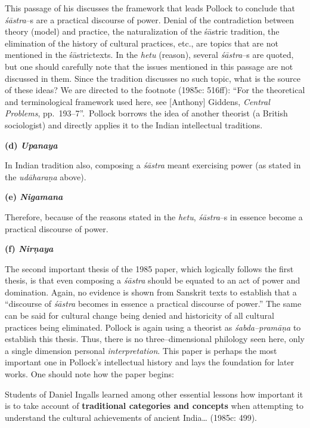 This passage of his discusses the framework that leads Pollock to conclude that\textit{ śāstra}–s are a practical discourse of power. Denial of the contradiction between theory (model) and practice, the naturalization of the śāstric tradition, the elimination of the history of cultural practices, etc., are topics that are not mentioned in the śāstrictexts. In the \textit{hetu} (reason), several \textit{śāstra}–s are quoted, but one should carefully note that the issues mentioned in this passage are not discussed in them. Since the tradition discusses no such topic, what is the source of these ideas? We are directed to the footnote (1985c: 516ff): “For the theoretical and terminological framework used here, see [Anthony] Giddens, \textit{Central Problems}, pp.~193–7”.~Pollock borrows the idea of another theorist (a British sociologist) and directly applies it to the Indian intellectual traditions.

\textbf{(d) \textit{Upanaya}}

In Indian tradition also, composing a \textit{śāstra }meant exercising power (as stated in the \textit{udāharaṇa} above).

\textbf{(e) \textit{Nigamana}}

Therefore, because of the reasons stated in the \textit{hetu}, \textit{śāstra}–s in essence become a practical discourse of power.

\textbf{(f) \textit{Nirṇaya}}

The second important thesis of the 1985 paper, which logically follows the first thesis, is that even composing a \textit{śāstra} should be equated to an act of power and domination. Again, no evidence is shown from Sanskrit texts to establish that a “discourse of \textit{śāstra} becomes in essence a practical discourse of power.” The same can be said for cultural change being denied and historicity of all cultural practices being eliminated. Pollock is again using a theorist as \textit{śabda–pramāṇa} to establish this thesis. Thus, there is no three–dimensional philology seen here, only a single dimension personal \textit{interpretation}. This paper is perhaps the most important one in Pollock’s intellectual history and lays the foundation for later works. One should note how the paper begins:

\begin{myquote}
Students of Daniel Ingalls learned among other essential lessons how important it is to take account of \textbf{traditional categories and concepts} when attempting to understand the cultural achievements of ancient India… (1985c: 499).
\end{myquote}

